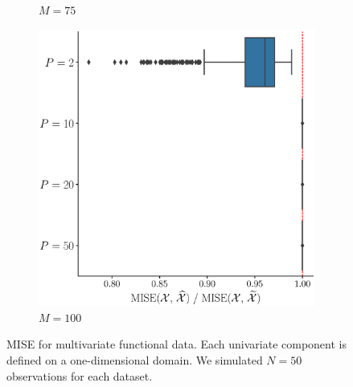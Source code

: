 \begin{results}
\begin{figure}
\begin{subfigure}[b]{0.49\textwidth}
         \caption{$M = 75$}
         \label{fig:mise_mfd_1d_75}
     \end{subfigure}
     \begin{subfigure}[b]{0.49\textwidth}
         \centering
         \includegraphics[width=\textwidth]{figures/scenario_1/mise_N50_M100.eps}
         \caption{$M = 100$}
         \label{fig:mise_mfd_1d_100}
    \end{subfigure}
    \caption{MISE for multivariate functional data. Each univariate component is defined on a one-dimensional domain. We simulated $N = 50$ observations for each dataset.}
    \label{fig:mise_mfd_1d}
\end{figure}


\end{results}
